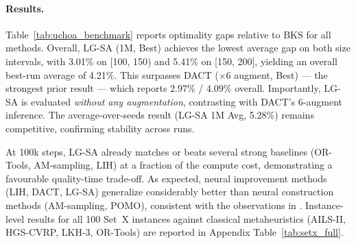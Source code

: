 \documentclass[letterpaper]{article} %
\begin{document}
\paragraph{Results.}
Table~\ref{tab:uchoa_benchmark} reports optimality gaps relative to BKS for all methods.
Overall, LG-SA (1M, Best) achieves the lowest average gap on both size intervals, with 3.01\% on [100, 150) and 5.41\% on [150, 200], yielding an overall best-run average of 4.21\%.
This surpasses DACT ($\times$6 augment, Best) — the strongest prior result — which reports 2.97\% / 4.09\% overall.
Importantly, LG-SA is evaluated \emph{without any augmentation}, contrasting with DACT's 6-augment inference.
The average-over-seeds result (LG-SA 1M Avg, 5.28\%) remains competitive, confirming stability across runs.

At 100k steps, LG-SA already matches or beats several strong baselines (OR-Tools, AM-sampling, LIH) at a fraction of the compute cost, demonstrating a favourable quality-time trade-off.
As expected, neural improvement methods (LIH, DACT, LG-SA) generalize considerably better than neural construction methods (AM-sampling, POMO), consistent with the observations in \citet{ma_learning_2021}.
Instance-level results for all 100 Set~X instances against classical metaheuristics (AILS-II, HGS-CVRP, LKH-3, OR-Tools) are reported in Appendix Table~\ref{tab:setx_full}.
\end{document}
